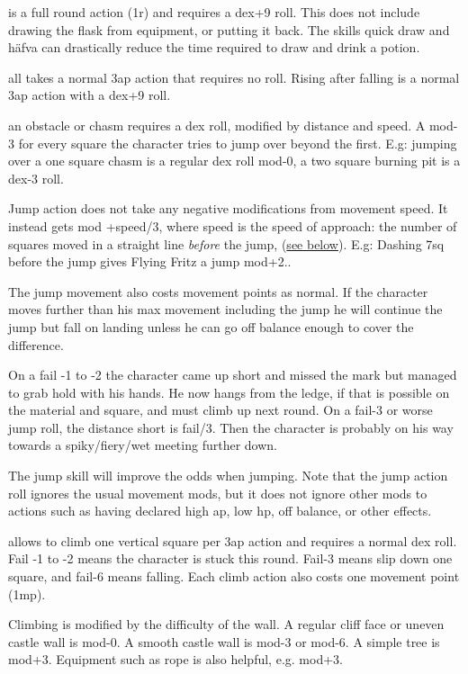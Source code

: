  is a full round action (1r) and requires a dex+9 roll. This does not include drawing the flask from equipment, or putting it back. The skills quick draw and häfva can drastically reduce the time required to draw and drink a potion.


 all takes a normal 3ap action that requires no roll. Rising after falling is a normal 3ap action with a dex+9 roll.


 an obstacle or chasm requires a dex roll, modified by distance and speed. A mod-3 for every square the character tries to jump over beyond the first. E.g: jumping over a one square chasm is a regular dex roll mod-0, a two square burning pit is a dex-3 roll.

Jump action does not take any negative modifications from movement speed. It instead gets mod +speed/3, where speed is the speed of approach: the number of squares moved in a straight line \emph{before} the jump, (\hyperref[approach]{see below}).
E.g: Dashing 7sq before the jump gives Flying Fritz a jump mod+2..

The jump movement also costs movement points as normal. If the character moves further than his max movement including the jump he will continue the jump but fall on landing unless he can go off balance enough to cover the difference.

On a fail -1 to -2 the character came up short and missed the mark but managed to grab hold with his hands. He now hangs from the ledge, if that is possible on the material and square, and must climb up next round. On a fail-3 or worse jump roll, the distance short is fail/3. Then the character is probably on his way towards a spiky/fiery/wet meeting further down.

The jump skill will improve the odds when jumping. Note that the jump action roll ignores the usual movement mods, but it does not ignore other mods to actions such as having declared high ap, low hp, off balance, or other effects.


 allows to climb one vertical square per 3ap action and requires a normal dex roll. Fail -1 to -2 means the character is stuck this round. Fail-3 means slip down one square, and fail-6 means falling. Each climb action also costs one movement point (1mp).

Climbing is modified by the difficulty of the wall. A regular cliff face or uneven castle wall is mod-0. A smooth castle wall is mod-3 or mod-6. A simple tree is mod+3. Equipment such as rope is also helpful, e.g. mod+3.

